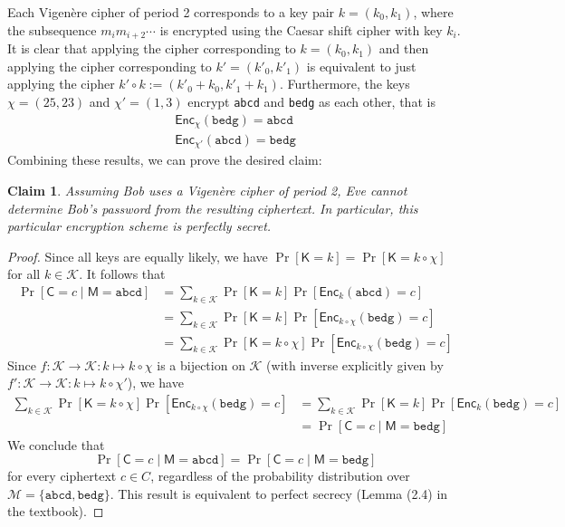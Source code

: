 \documentclass[12pt]{article}
\numberwithin{equation}{section}
\theoremstyle{plain}
\newtheorem{claim}{Claim}
\newcommand{\set}[1]{\{ #1 \}}
\DeclareMathOperator*{\prob}{Pr}
\newcommand{\given}{\mid}
\newcommand{\ctext}{\algo{C}}
\newcommand{\ptexts}{\mathcal{M}}
\newcommand{\ptext}{\algo{M}}
\newcommand{\keys}{\mathcal{K}}
\newcommand{\key}{\algo{K}}
\newcommand{\algo}[1]{\mathsf{#1}}
\newcommand{\enc}{\algo{Enc}}
\begin{document}
Each Vigen\`ere cipher of period 2 corresponds to a key pair $k = (k_0, k_1)$,
where the subsequence $m_im_{i+2}\cdots$
is encrypted using the Caesar shift cipher with key $k_i$.
It is clear that applying the cipher corresponding to $k = (k_0, k_1)$
and then applying the cipher corresponding to $k' = (k'_0, k'_1)$
is equivalent to just applying the cipher $k' \circ k := (k'_0 + k_0, k'_1 + k_1)$.
Furthermore, the keys $\chi = (25, 23)$ and $\chi' = (1, 3)$
encrypt \texttt{abcd} and \texttt{bedg} as each other, that is
\begin{gather*}
    \enc_{\chi}(\texttt{bedg}) = \texttt{abcd}\\
    \enc_{\chi'}(\texttt{abcd}) = \texttt{bedg}
\end{gather*}
Combining these results, we can prove the desired claim:
\begin{claim}\label{claim:period-2-secure}
Assuming Bob uses a Vigen\`ere cipher of period 2,
Eve cannot determine Bob's password from the resulting ciphertext.
In particular, this particular encryption scheme is perfectly secret.
\end{claim}
\begin{proof}
Since all keys are equally likely,
we have $\prob[\key = k] = \prob[\key = k \circ \chi]$ for all $k \in \keys$.
It follows that
\begin{align*}
    \prob[\ctext = c \given \ptext = \texttt{abcd}]
        &= \sum_{k \in \keys}{ \prob[\key = k]\prob[\enc_{k}(\texttt{abcd}) = c] }\\
        &= \sum_{k \in \keys}{ \prob[\key = k]\prob[\enc_{k \circ \chi}(\texttt{bedg}) = c] }\\
        &= \sum_{k \in \keys}{ \prob[\key = k \circ \chi]\prob[\enc_{k \circ \chi}(\texttt{bedg}) = c] }
\end{align*}
Since $f:\keys \to \keys:k \mapsto k \circ \chi$ is a bijection on $\keys$
(with inverse explicitly given by $f':\keys \to \keys: k \mapsto k \circ \chi'$),
we have
\begin{align*}
    \sum_{k \in \keys}{ \prob[\key = k \circ \chi]\prob[\enc_{k \circ \chi}(\texttt{bedg}) = c] }
        &= \sum_{k \in \keys}{ \prob[\key = k]\prob[\enc_{k}(\texttt{bedg}) = c] }\\
        &= \prob[\ctext = c \given \ptext = \texttt{bedg}]
\end{align*}
We conclude that
\begin{equation*}
    \prob[\ctext = c \given \ptext = \texttt{abcd}] = \prob[\ctext = c \given \ptext = \texttt{bedg}]
\end{equation*}
for every ciphertext $c \in C$,
regardless of the probability distribution over $\ptexts = \set{ \texttt{abcd}, \texttt{bedg} }$.
This result is equivalent to perfect secrecy (Lemma (2.4) in the textbook).
\end{proof}
\end{document}
